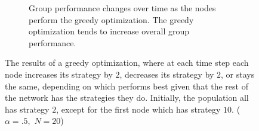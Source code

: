 \documentclass{article}
\begin{document}
\begin{figure}
\begin{subfigure}{.5 \textwidth}
\begin{center}
\end{center}
\caption{Group performance changes over time as the nodes perform the greedy optimization.  The greedy optimization tends to increase overall group performance.}
\end{subfigure}
\caption{\label{greedy_opt} The results of a greedy optimization, where at each time step each node increases its strategy by $2$, decreases its strategy by $2$, or stays the same, depending on which performs best given that the rest of the network has the strategies they do.  Initially, the population all has strategy $2$, except for the first node which has strategy $10$. ($\alpha=.5,$ $N=20$)}
\end{figure}

\end{document}
